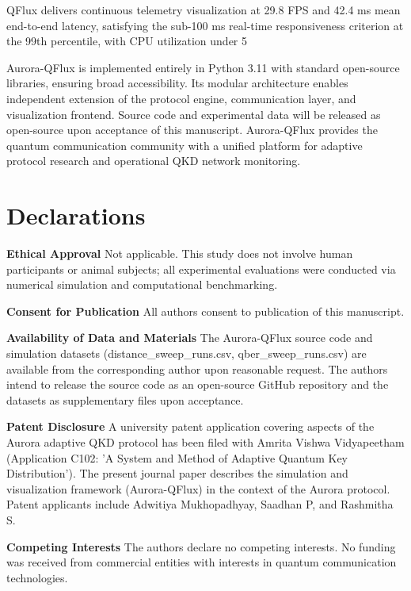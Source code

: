 {{{{{{QFlux delivers continuous telemetry visualization at 29.8 FPS and 42.4 ms mean end-to-end latency, satisfying the sub-100 ms real-time responsiveness criterion at the 99th percentile, with CPU utilization under 5%

Aurora-QFlux is implemented entirely in Python 3.11 with standard open-source libraries, ensuring broad accessibility. Its modular architecture enables independent extension of the protocol engine, communication layer, and visualization frontend. Source code and experimental data will be released as open-source upon acceptance of this manuscript. Aurora-QFlux provides the quantum communication community with a unified platform for adaptive protocol research and operational QKD network monitoring.

\section{Declarations}
\textbf{Ethical Approval  }Not applicable. This study does not involve human participants or animal subjects; all experimental evaluations were conducted via numerical simulation and computational benchmarking.

\textbf{Consent for Publication  }All authors consent to publication of this manuscript.

\textbf{Availability of Data and Materials  }The Aurora-QFlux source code and simulation datasets (distance_sweep_runs.csv, qber_sweep_runs.csv) are available from the corresponding author upon reasonable request. The authors intend to release the source code as an open-source GitHub repository and the datasets as supplementary files upon acceptance.

\textbf{Patent Disclosure  }A university patent application covering aspects of the Aurora adaptive QKD protocol has been filed with Amrita Vishwa Vidyapeetham (Application C102: 'A System and Method of Adaptive Quantum Key Distribution'). The present journal paper describes the simulation and visualization framework (Aurora-QFlux) in the context of the Aurora protocol. Patent applicants include Adwitiya Mukhopadhyay, Saadhan P, and Rashmitha S.

\textbf{Competing Interests  }The authors declare no competing interests. No funding was received from commercial entities with interests in quantum communication technologies.

}}}}}}
